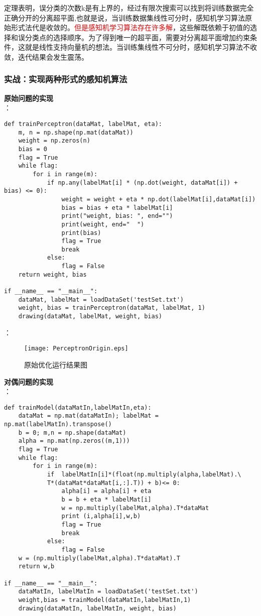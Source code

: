 定理表明，误分类的次数k是有上界的，经过有限次搜索可以找到将训练数据完全正确分开的分离超平面,也就是说，当训练数据集线性可分时，感知机学习算法原始形式法代是收敛的。\textcolor{red}{但是感知机学习算法存在许多解}，这些解既依赖于初值的选择和误分类点的选择顺序。为了得到唯一的超平面，需要对分离超平面增加约束条件，这就是线性支持向量机的想法。当训练集线性不可分时，感知机学习算法不收敛，迭代结果会发生震荡。




\subsubsection{实战：实现两种形式的感知机算法}
\textbf{原始问题的实现}\\
：
\begin{lstlisting}
def trainPerceptron(dataMat, labelMat, eta):
    m, n = np.shape(np.mat(dataMat))
    weight = np.zeros(n)
    bias = 0
    flag = True
    while flag:
        for i in range(m):
            if np.any(labelMat[i] * (np.dot(weight, dataMat[i]) + bias) <= 0):
                weight = weight + eta * np.dot(labelMat[i],dataMat[i])
                bias = bias + eta * labelMat[i]
                print("weight, bias: ", end="")
                print(weight, end="  ")
                print(bias)
                flag = True
                break
            else:
                flag = False
    return weight, bias

if __name__ == "__main__":
    dataMat, labelMat = loadDataSet('testSet.txt')
    weight, bias = trainPerceptron(dataMat, labelMat, 1)
    drawing(dataMat, labelMat, weight, bias)
\end{lstlisting}

：
\begin{figure}[!htb]
  \centering
  \texttt{[image: PerceptronOrigin.eps]}
  \caption{原始优化运行结果图}
\end{figure}





\textbf{对偶问题的实现}\\
：
\begin{lstlisting}
def trainModel(dataMatIn,labelMatIn,eta):
    dataMat = np.mat(dataMatIn); labelMat = np.mat(labelMatIn).transpose()
    b = 0; m,n = np.shape(dataMat)
    alpha = np.mat(np.zeros((m,1)))
    flag = True
    while flag:
        for i in range(m):
            if  labelMatIn[i]*(float(np.multiply(alpha,labelMat).\
            T*(dataMat*dataMat[i,:].T)) + b)<= 0:
                alpha[i] = alpha[i] + eta
                b = b + eta * labelMat[i]
                w = np.multiply(labelMat,alpha).T*dataMat
                print (i,alpha[i],w,b)
                flag = True
                break
            else:
                flag = False
    w = (np.multiply(labelMat,alpha).T*dataMat).T
    return w,b

if __name__ == "__main__":
    dataMatIn, labelMatIn = loadDataSet('testSet.txt')
    weight,bias = trainModel(dataMatIn,labelMatIn,1)
    drawing(dataMatIn, labelMatIn, weight, bias)
\end{lstlisting}


